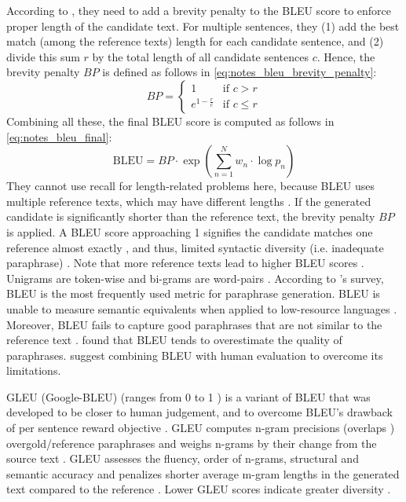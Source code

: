 According to \citet{papineni_bleu_2001}, they need to add a brevity penalty to the BLEU score to enforce proper length of the candidate text. 
For multiple sentences, they (1) add the best match (among the reference texts) length for each candidate sentence, and (2) divide this sum $r$ by the total length of all candidate sentences $c$. 
Hence, the brevity penalty $BP$ is defined as follows in \autoref{eq:notes_bleu_brevity_penalty}:
\begin{equation}
    BP = \begin{cases}
        1 & \text{if } c > r \\
        e^{1 - \frac{r}{c}} & \text{if } c \leq r
    \end{cases}
\label{eq:notes_bleu_brevity_penalty}
\end{equation}
Combining all these, the final BLEU score is computed as follows in \autoref{eq:notes_bleu_final}:
\begin{equation}
    \text{BLEU} = BP \cdot \exp\left(\sum_{n=1}^{N} w_n \cdot \log p_n\right)
\label{eq:notes_bleu_final}
\end{equation}
They cannot use recall for length-related problems here, because BLEU uses multiple reference texts, which may have different lengths \citep{papineni_bleu_2001,banerjee_METEOR_2005}.
If the generated candidate is significantly shorter than the reference text, the brevity penalty $BP$ is applied.
A BLEU score approaching 1 signifies the candidate matches one reference almost exactly \citep{papineni_bleu_2001}, 
and thus, limited syntactic diversity (i.e. inadequate paraphrase) \citep{kurt_pehlivanoglu_comparative_2024}.
Note that more reference texts lead to higher BLEU scores \citep{papineni_bleu_2001}.
Unigrams are token-wise and bi-grams are word-pairs \citet{palivela_optimization_2021}.
According to \citet{zhou_paraphrase_2021}'s survey, BLEU is the most frequently used metric for paraphrase generation.
BLEU is unable to measure semantic equivalents \citep{kurt_pehlivanoglu_comparative_2024,zhou_paraphrase_2021} 
when applied to low-resource languages \citep{zhou_paraphrase_2021}.
Moreover, BLEU fails to capture good paraphrases that are not similar to the reference text \citep{zhou_paraphrase_2021}.
\citet{kurt_pehlivanoglu_comparative_2024} found that BLEU tends to overestimate the quality of paraphrases.
\citet{zhou_paraphrase_2021} suggest combining BLEU with human evaluation to overcome its limitations.

GLEU (Google-BLEU) (ranges from 0 to 1 \citep{kurt_pehlivanoglu_comparative_2024}) is a variant of BLEU that was developed to be closer to human judgement, and to 
overcome BLEU's drawback of per sentence reward objective \citep{palivela_optimization_2021}.
GLEU computes n-gram precisions (overlaps \citep{kurt_pehlivanoglu_comparative_2024}) overgold/reference paraphrases 
and weighs n-grams by their change from the source text \citep{palivela_optimization_2021}.
GLEU assesses the fluency, order of n-grams, structural and semantic accuracy 
and penalizes shorter average m-gram lengths in the generated text compared to the reference \citep{kurt_pehlivanoglu_comparative_2024}.
Lower GLEU scores indicate greater diversity \citep{kurt_pehlivanoglu_comparative_2024}.


